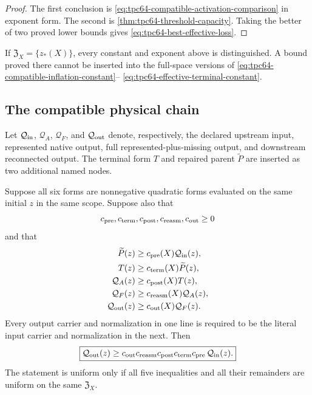 \begin{proof}
The first conclusion is
\eqref{eq:tpc64-compatible-activation-comparison} in exponent form.  The
second is \cref{thm:tpc64-threshold-capacity}.  Taking the better of two
proved lower bounds gives \eqref{eq:tpc64-best-effective-loss}.
\end{proof}

If \(\mathfrak Z_X=\{z_*(X)\}\), every constant and exponent above is
distinguished.  A bound proved there cannot be inserted into the
full-space versions of
\eqref{eq:tpc64-compatible-inflation-constant}--%
\eqref{eq:tpc64-effective-terminal-constant}.

\subsection{The compatible physical chain}

Let \(\mathcal Q_{\rm in}\), \(\mathcal Q_A\),
\(\mathcal Q_F\), and \(\mathcal Q_{\rm out}\) denote, respectively, the
declared upstream input, represented native output, full
represented-plus-missing output, and downstream reconnected output.  The
terminal form \(T\) and repaired parent \(\widetilde P\) are inserted as
two additional named nodes.

\begin{theorem}
\label{thm:tpc64-five-arrow-compatible-chain}
Suppose all six forms are nonnegative quadratic forms evaluated on the same
initial \(z\) in the same scope.  Suppose also that
\[
 c_{\rm pre},c_{\rm term},c_{\rm post},c_{\rm reasm},c_{\rm out}\ge0
\]
and that
\begin{align}
 \widetilde P(z)
 &\ge c_{\rm pre}(X)\mathcal Q_{\rm in}(z),
 \label{eq:tpc64-pre-parent-arrow}\\
 T(z)
 &\ge c_{\rm term}(X)\widetilde P(z),
 \label{eq:tpc64-terminal-arrow}\\
 \mathcal Q_A(z)
 &\ge c_{\rm post}(X)T(z),
 \label{eq:tpc64-post-terminal-arrow}\\
 \mathcal Q_F(z)
 &\ge c_{\rm reasm}(X)\mathcal Q_A(z),
 \label{eq:tpc64-reassembly-arrow}\\
 \mathcal Q_{\rm out}(z)
 &\ge c_{\rm out}(X)\mathcal Q_F(z).
 \label{eq:tpc64-downstream-arrow}
\end{align}
Every output carrier and normalization in one line is required to be the
literal input carrier and normalization in the next.  Then
\begin{equation}
 \boxed{
 \mathcal Q_{\rm out}(z)
 \ge
 c_{\rm out}c_{\rm reasm}c_{\rm post}
 c_{\rm term}c_{\rm pre}\,
 \mathcal Q_{\rm in}(z).}
 \label{eq:tpc64-five-arrow-product}
\end{equation}
The statement is uniform only if all five inequalities and all their
remainders are uniform on the same \(\mathfrak Z_X\).
\end{theorem}

